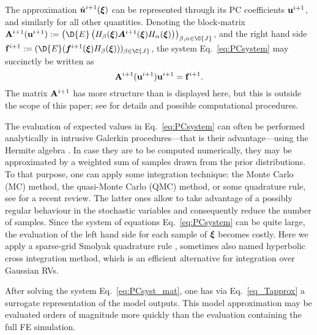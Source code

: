 \documentclass[preprint,12pt]{elsarticle}
\newcommand{\vek}[1]{\mathchoice{\displaystyle\boldsymbol#1}
{\textstyle\boldsymbol#1}{\scriptstyle\boldsymbol#1}
{\scriptscriptstyle\boldsymbol#1}}
\newcommand{\mat}[1]{\mathchoice{\displaystyle\mathbf#1}
{\textstyle\mathbf#1}{\scriptstyle\mathbf#1}
{\scriptscriptstyle\mathbf#1}}
\begin{document}
The approximation $\tilde{\vek{u}}^{i+1}(\vek{\xi})$ can be
represented through its PC coefficients $\mat{u}^{i+1}$, and similarly
for all other quantities. Denoting the block-matrix
$\mat{A}^{i+1}(\mat{u}^{i+1}) := \left(\D{E}\left(H_\beta(\vek{\xi})
\vek{A}^{i+1}(\vek{\xi}) H_\alpha(\vek{\xi})\right)\right)_{\beta, \alpha \in \C{J}}$,
and the right hand side $\mat{f}^{i+1} :=
(\D{E}(\vek{f}^{i+1}(\vek{\xi}) H_\beta(\vek{\xi})))_{\beta\in\C{J}}$, the system
Eq.~\eqref{eq:PCsystem} may succinctly be written as
\begin{equation}
  \label{eq:PCsyst_mat}
  \mat{A}^{i+1}(\mat{u}^{i+1}) \mat{u}^{i+1} = \mat{f}^{i+1}.
\end{equation}
The matrix $\mat{A}^{i+1}$ has more structure than is displayed here,
but this is outside the scope of this paper;
see \cite{Matthies:2005:CMAME, Matthies:2007:IB} for details and
possible computational procedures.

The evaluation of expected values in Eq.~\eqref{eq:PCsystem} can often
be performed analytically in intrusive Galerkin procedures---that is
their advantage---using the Hermite algebra \cite{Matthies:2007:IB}.
In case they are to be computed numerically, they may be
approximated by a weighted sum of samples drawn from the
prior distributions. To that purpose, one can apply some
integration technique: the Monte Carlo (MC) method, the quasi-Monte Carlo
(QMC) method, or some quadrature rule, see \cite{Matthies:2007:IB} for
a recent review. The latter ones allow to take advantage of a possibly
regular behaviour
in the stochastic variables and consequently reduce the number of
samples. Since the system of equations Eq.~\eqref{eq:PCsystem} can be
quite large, the evaluation of the left hand side for each sample of
$\vek{\xi}$ becomes costly. Here we apply a sparse-grid Smolyak quadrature
rule \cite{Smolyak:1963, Keese:2003:TR, Matthies:2005:CMAME,
  Matthies:2007:IB}, sometimes also named hyperbolic cross integration
method, which is an efficient alternative for integration over Gaussian RVs.

After solving the system Eq.~\eqref{eq:PCsyst_mat}, one has via
Eq.~\eqref{eq_Tapprox} a surrogate representation of the model
outputs. This model approximation may be evaluated orders of magnitude
more quickly than the evaluation containing the full FE simulation.
\end{document}
